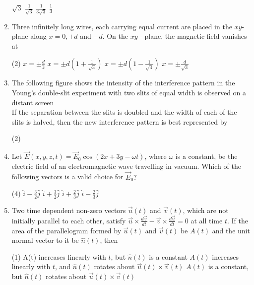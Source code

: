 \begin{enumerate}
\begin{tasks}
	\task[\textbf{a.}]$\sqrt{3}$
	\task[\textbf{b.}]$\frac{1}{\sqrt{3}}$
	\task[\textbf{c.}]$\frac{1}{3 \sqrt{3}}$
	\task[\textbf{d.}]$\frac{1}{3}$ 
\end{tasks}
\item Three infinitely long wires, each carrying equal current are placed in the $x y$-plane along $x=0,+d$ and $-d$. On the $x y$ - plane, the magnetic field vanishes at
 \begin{tasks}(2)
	\task[\textbf{a.}]$x=\pm \frac{d}{2}$
	\task[\textbf{b.}]$x=\pm d\left(1+\frac{1}{\sqrt{3}}\right)$
	\task[\textbf{c.}] $x=\pm d\left(1-\frac{1}{\sqrt{3}}\right)$
	\task[\textbf{d.}] $x=\pm \frac{d}{\sqrt{3}}$
\end{tasks}	
\item The following figure shows the intensity of the interference pattern in the Young's double-slit experiment with two slits of equal width is observed on a distant screen	\\
If the separation between the slits is doubled and the width of each of the slits is halved, then the new interference pattern is best represented by 
\begin{tasks}(2)
	\task[\textbf{a.}]
	\task[\textbf{b.}]
	\task[\textbf{c.}]
	\task[\textbf{d.}] 
\end{tasks}
\item  Let $\vec{E}(x, y, z, t)=\vec{E}_{0} \cos (2 x+3 y-\omega t)$, where $\omega$ is a constant, be the electric field of an electromagnetic wave travelling in vacuum. Which of the following vectors is a valid choice for $\vec{E}_{0} ?$	
 \begin{tasks}(4)
	\task[\textbf{a.}] $\hat{i}-\frac{3}{2} \hat{j}$
	\task[\textbf{b.}]$\hat{i}+\frac{3}{2} \hat{j}$
	\task[\textbf{c.}]$\hat{i}+\frac{2}{3} \hat{j}$
	\task[\textbf{d.}] $\hat{i}-\frac{2}{3} \hat{j}$
\end{tasks}
\item Two time dependent non-zero vectors $\vec{u}(t)$ and $\vec{v}(t)$, which are not initially parallel to each other, satisfy $\vec{u} \times \frac{d \vec{v}}{d t}-\vec{v} \times \frac{d \vec{u}}{d t}=0$ at all time $t$. If the area of the parallelogram formed by $\vec{u}(t)$ and $\vec{v}(t)$ be $A(t)$ and the unit normal vector to it be $\hat{n}(t)$, then
 \begin{tasks}(1)
	\task[\textbf{a.}] A(t) increases linearly with $t$, but $\hat{n}(t)$ is a constant
	\task[\textbf{b.}] $A(t)$ increases linearly with $t$, and $\hat{n}(t)$ rotates about $\vec{u}(t) \times \vec{v}(t)$
	\task[\textbf{c.}]$A(t)$ is a constant, but $\hat{n}(t)$ rotates about $\vec{u}(t) \times \vec{v}(t)$

\end{tasks}
\end{enumerate}
